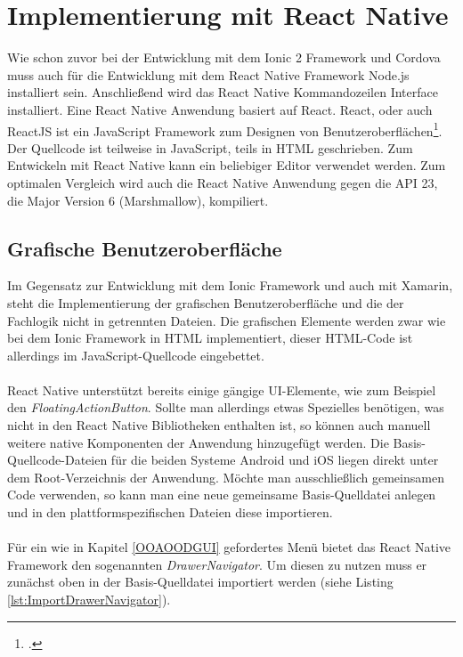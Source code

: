 \section{Implementierung mit React Native}

Wie schon zuvor bei der Entwicklung mit dem Ionic 2 Framework und Cordova muss auch für die Entwicklung mit dem React Native Framework Node.js installiert sein. Anschließend wird das React Native Kommandozeilen Interface installiert. Eine React Native Anwendung basiert auf React. React, oder auch ReactJS ist ein JavaScript Framework zum Designen von Benutzeroberflächen\footcite{React}. Der Quellcode ist teilweise in JavaScript, teils in HTML geschrieben. Zum Entwickeln mit React Native kann ein beliebiger Editor verwendet werden. Zum optimalen Vergleich wird auch die React Native Anwendung gegen die API 23, die Major Version 6 (Marshmallow), kompiliert.  

\subsection*{Grafische Benutzeroberfläche}

Im Gegensatz zur Entwicklung mit dem Ionic Framework und auch mit Xamarin, steht die Implementierung der grafischen Benutzeroberfläche und die der Fachlogik nicht in getrennten Dateien. Die grafischen Elemente werden zwar wie bei dem Ionic Framework in HTML implementiert, dieser HTML-Code ist allerdings im JavaScript-Quellcode eingebettet. 
\\
\\
React Native unterstützt bereits einige gängige UI-Elemente, wie zum Beispiel den \textit{FloatingActionButton}. Sollte man allerdings etwas Spezielles benötigen, was nicht in den React Native Bibliotheken enthalten ist, so können auch manuell weitere native Komponenten der Anwendung hinzugefügt werden. Die Basis-Quellcode-Dateien für die beiden Systeme Android und iOS liegen direkt unter dem Root-Verzeichnis der Anwendung. Möchte man ausschließlich gemeinsamen Code verwenden, so kann man eine neue gemeinsame Basis-Quelldatei anlegen und in den plattformspezifischen Dateien diese importieren. 
\\
\\
Für ein wie in Kapitel \ref{OOAOODGUI} gefordertes Menü bietet das React Native Framework den sogenannten \textit{DrawerNavigator}. Um diesen zu nutzen muss er zunächst oben in der Basis-Quelldatei importiert werden (siehe Listing \ref{lst:ImportDrawerNavigator}).

